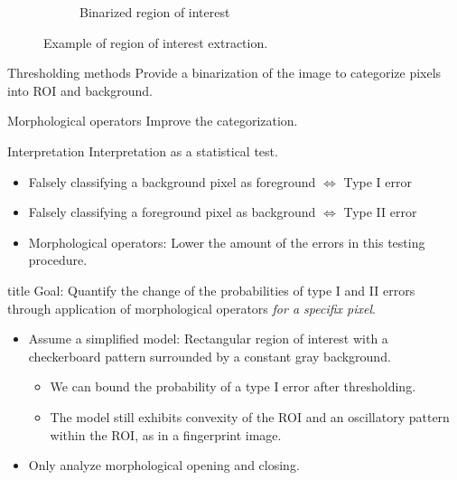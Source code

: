 \documentclass[presentation]{beamer}
\begin{document}
\begin{frame}
\begin{figure}
\begin{subfigure}[t]{0.45\linewidth}
			\caption{Binarized region of interest}
		\end{subfigure}
		\caption{Example of region of interest extraction.}
	\end{figure}
\end{frame}

\begin{frame}
	\begin{block}{Thresholding methods}
		Provide a binarization of the image to categorize pixels into ROI and background.
	\end{block}
	\pause
	\begin{block}{Morphological operators}
		Improve the categorization.
	\end{block}
	\pause
	\begin{alertblock}{Interpretation}
		Interpretation as a statistical test.
		\begin{itemize}
			\item<1-> Falsely classifying a background pixel as foreground $\Leftrightarrow$ Type I error
			\item<2-> Falsely classifying a foreground pixel as background $\Leftrightarrow$ Type II error
			\item<3-> Morphological operators: Lower the amount of the errors in this testing procedure.
		\end{itemize}
	\end{alertblock}
\end{frame}

\begin{frame}
	\begin{beamercolorbox}[sep=8pt,center,shadow=true,rounded=true]{title}
		Goal: Quantify the change of the probabilities of type I and II errors through application of morphological operators \pause \emph{for a specifix pixel}.
	\end{beamercolorbox}
\end{frame}

\begin{frame}
	\begin{itemize}
		\item Assume a simplified model: Rectangular region of interest with a checkerboard pattern surrounded by a constant gray background.
		\begin{itemize}
			\item We can bound the probability of a type I error after thresholding.
			\item The model still exhibits convexity of the ROI and an oscillatory pattern within the ROI, as in a fingerprint image.
		\end{itemize}
		\item Only analyze morphological opening and closing.
	\end{itemize}
\end{frame}
\end{document}
